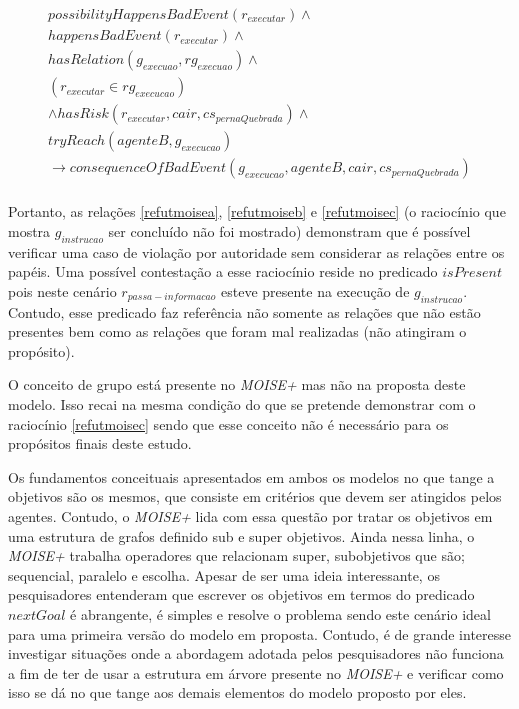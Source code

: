 \begin{eqnarray}\label{refutmoisec}
	possibilityHappensBadEvent(r_{executar}) \wedge  \nonumber \\ 
    happensBadEvent(r_{executar}) \wedge \nonumber \\ 
    hasRelation(g_{execuao},rg_{execuao}) \wedge \nonumber \\
    (r_{executar} \in rg_{execucao}) \nonumber \\ 
	\wedge hasRisk(r_{executar}, cair, cs_{pernaQuebrada}) \wedge \nonumber \\ 
    tryReach(agenteB,g_{execucao}) \nonumber \\ 
	\to consequenceOfBadEvent(g_{execucao},agenteB,cair,cs_{pernaQuebrada}) \nonumber \\ 
\end{eqnarray}

Portanto, as relações \ref{refutmoisea}, \ref{refutmoiseb} e \ref{refutmoisec} (o raciocínio que mostra $g_{instrucao}$ ser concluído não foi mostrado) 
demonstram que é possível verificar uma caso de violação por autoridade sem considerar as relações entre os papéis. Uma possível contestação a esse 
raciocínio reside no predicado $isPresent$ pois neste cenário $r_{passa-informacao}$ esteve presente na execução de $g_{instrucao}$. Contudo, esse predicado 
faz referência não somente as relações que não estão presentes bem como as relações que foram mal realizadas (não atingiram o propósito). 

O conceito de grupo está presente no \textit{MOISE+} mas não na proposta deste modelo. Isso recai na mesma condição do que se pretende demonstrar com o 
raciocínio \ref{refutmoisec} sendo que esse conceito não é necessário para os propósitos finais deste estudo. 

Os fundamentos conceituais apresentados em ambos os modelos no que tange a objetivos são os mesmos, que consiste em critérios que devem ser atingidos 
pelos agentes. Contudo, o \textit{MOISE+} lida com essa questão por tratar os objetivos em uma estrutura de grafos definido sub e super objetivos. Ainda 
nessa linha, o \textit{MOISE+} trabalha operadores que relacionam super, subobjetivos que são; sequencial, paralelo e escolha. Apesar de ser uma ideia 
interessante, os pesquisadores entenderam que escrever os objetivos em termos do predicado $nextGoal$ é abrangente, é simples e resolve o problema sendo este 
cenário ideal para uma primeira versão do modelo em proposta. Contudo, é de grande interesse investigar situações onde a abordagem adotada pelos pesquisadores 
não funciona a fim de ter de usar a estrutura em árvore presente no \textit{MOISE+} e verificar como isso se dá no que tange aos demais elementos do modelo 
proposto por eles.

